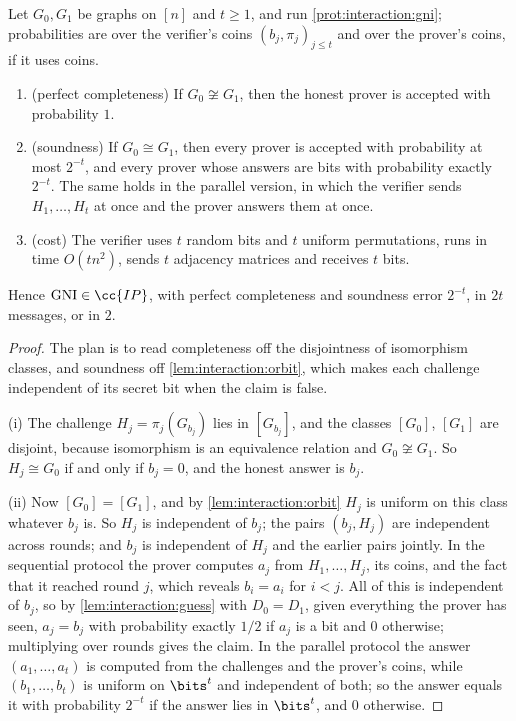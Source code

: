 \begin{refsection}
\begin{theorem}\label{thm:interaction:gni}
Let $G_0,G_1$ be graphs on $[n]$ and $t\ge1$, and run \cref{prot:interaction:gni}; probabilities are over the verifier's coins $(b_j,\pi_j)_{j\le t}$ and over the prover's coins, if it uses coins.
\begin{enumerate}
\item (perfect completeness) If $G_0\not\cong G_1$, then the honest prover is accepted with probability $1$.
\item (soundness) If $G_0\cong G_1$, then every prover is accepted with probability at most $2^{-t}$, and every prover whose answers are bits with probability exactly $2^{-t}$. The same holds in the parallel version, in which the verifier sends $H_1,\dots,H_t$ at once and the prover answers them at once.
\item (cost) The verifier uses $t$ random bits and $t$ uniform permutations, runs in time $O(tn^2)$, sends $t$ adjacency matrices and receives $t$ bits.
\end{enumerate}
Hence $\interactiongni\in\cc{IP}$, with perfect completeness and soundness error $2^{-t}$, in $2t$ messages, or in $2$.
\end{theorem}

\begin{proof}
The plan is to read completeness off the disjointness of isomorphism classes, and soundness off \cref{lem:interaction:orbit}, which makes each challenge independent of its secret bit when the claim is false.

(i) The challenge $H_j=\pi_j(G_{b_j})$ lies in $[G_{b_j}]$, and the classes $[G_0]$, $[G_1]$ are disjoint, because isomorphism is an equivalence relation and $G_0\not\cong G_1$. So $H_j\cong G_0$ if and only if $b_j=0$, and the honest answer is $b_j$.

(ii) Now $[G_0]=[G_1]$, and by \cref{lem:interaction:orbit} $H_j$ is uniform on this class whatever $b_j$ is. So $H_j$ is independent of $b_j$; the pairs $(b_j,H_j)$ are independent across rounds; and $b_j$ is independent of $H_j$ and the earlier pairs jointly. In the sequential protocol the prover computes $a_j$ from $H_1,\dots,H_j$, its coins, and the fact that it reached round $j$, which reveals $b_i=a_i$ for $i<j$. All of this is independent of $b_j$, so by \cref{lem:interaction:guess} with $D_0=D_1$, given everything the prover has seen, $a_j=b_j$ with probability exactly $1/2$ if $a_j$ is a bit and $0$ otherwise; multiplying over rounds gives the claim. In the parallel protocol the answer $(a_1,\dots,a_t)$ is computed from the challenges and the prover's coins, while $(b_1,\dots,b_t)$ is uniform on $\bits^t$ and independent of both; so the answer equals it with probability $2^{-t}$ if the answer lies in $\bits^t$, and $0$ otherwise.


\end{proof}
\end{refsection}
